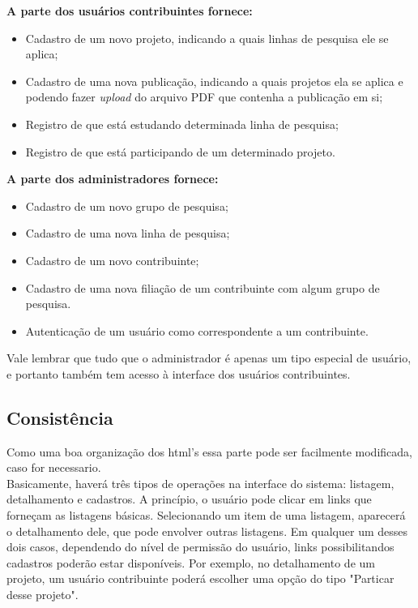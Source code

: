 \documentclass[11pt, a4paper]{article}
\begin{document}
			\noindent \textbf{A parte dos usuários contribuintes fornece:}
			\begin{itemize}
				\item Cadastro de um novo projeto, indicando a quais linhas de
				pesquisa ele se aplica;
				\item Cadastro de uma nova publicação, indicando a quais
				projetos ela se aplica e podendo fazer \textit{upload} do
				arquivo PDF que contenha a publicação em si;
				\item Registro de que está estudando determinada linha de
				pesquisa;
				\item Registro de que está participando de um determinado
				projeto.
			\end{itemize}
			
			\noindent \textbf{A parte dos administradores fornece:}
			\begin{itemize}
				\item Cadastro de um novo grupo de pesquisa;
				\item Cadastro de uma nova linha de pesquisa;
				\item Cadastro de um novo contribuinte;
				\item Cadastro de uma nova filiação de um contribuinte com
				algum grupo de pesquisa.
				\item Autenticação de um usuário como correspondente a um
				contribuinte.
			\end{itemize}
			
			Vale lembrar que tudo que o administrador é apenas um tipo especial
			de usuário, e portanto também tem acesso à interface dos usuários
			contribuintes.
						
		\subsection{Consistência}
			Como uma boa organização dos html's essa parte pode ser 
			facilmente modificada, caso for necessario.\\
			\indent Basicamente, haverá três tipos de operações na interface do
			sistema: listagem, detalhamento e cadastros. A princípio, o usuário
			pode clicar em links que forneçam as listagens básicas.
			Selecionando um item de uma listagem, aparecerá o detalhamento
			dele, que pode envolver outras listagens. Em qualquer um desses
			dois casos, dependendo do nível de permissão do usuário, links
			possibilitandos cadastros poderão estar disponíveis. Por exemplo,
			no detalhamento de um projeto, um usuário contribuinte poderá
			escolher uma opção do tipo "Particar desse projeto".
\end{document}
